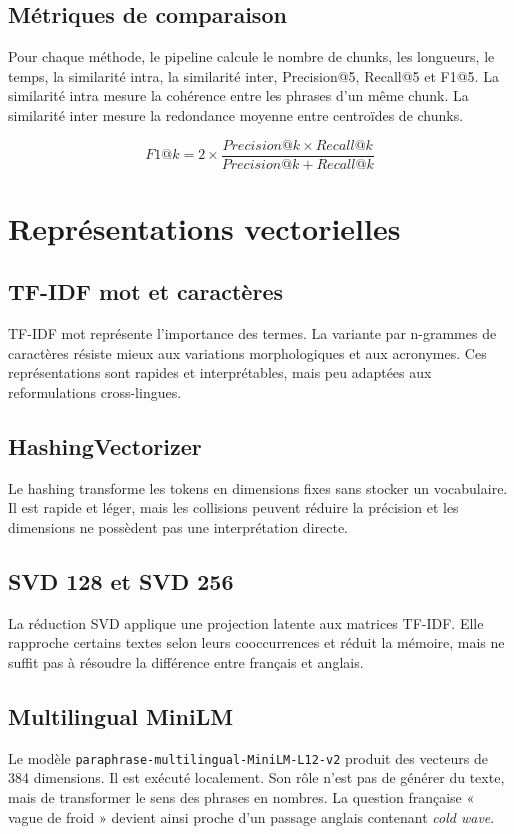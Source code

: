 \documentclass[12pt,a4paper,oneside]{report}
\newcommand{\tech}[1]{\texttt{#1}}
\begin{document}
\subsection{Métriques de comparaison}
Pour chaque méthode, le pipeline calcule le nombre de chunks, les longueurs, le temps, la similarité intra, la similarité inter, Precision@5, Recall@5 et F1@5. La similarité intra mesure la cohérence entre les phrases d'un même chunk. La similarité inter mesure la redondance moyenne entre centroïdes de chunks.

\begin{equation}
F1@k = 2 \times \frac{Precision@k \times Recall@k}{Precision@k + Recall@k}
\end{equation}

\section{Représentations vectorielles}
\subsection{TF-IDF mot et caractères}
TF-IDF mot représente l'importance des termes. La variante par n-grammes de caractères résiste mieux aux variations morphologiques et aux acronymes. Ces représentations sont rapides et interprétables, mais peu adaptées aux reformulations cross-lingues.

\subsection{HashingVectorizer}
Le hashing transforme les tokens en dimensions fixes sans stocker un vocabulaire. Il est rapide et léger, mais les collisions peuvent réduire la précision et les dimensions ne possèdent pas une interprétation directe.

\subsection{SVD 128 et SVD 256}
La réduction SVD applique une projection latente aux matrices TF-IDF. Elle rapproche certains textes selon leurs cooccurrences et réduit la mémoire, mais ne suffit pas à résoudre la différence entre français et anglais.

\subsection{Multilingual MiniLM}
Le modèle \tech{paraphrase-multilingual-MiniLM-L12-v2} produit des vecteurs de 384 dimensions. Il est exécuté localement. Son rôle n'est pas de générer du texte, mais de transformer le sens des phrases en nombres. La question française « vague de froid » devient ainsi proche d'un passage anglais contenant \textit{cold wave}.
\end{document}
